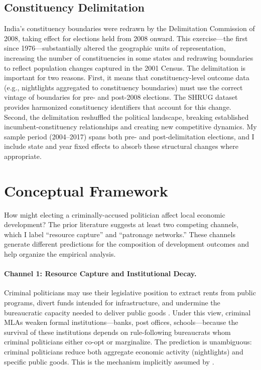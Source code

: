 \documentclass[12pt]{article}
\begin{document}
\subsection{Constituency Delimitation}

India's constituency boundaries were redrawn by the Delimitation Commission of 2008, taking effect for elections held from 2008 onward. This exercise---the first since 1976---substantially altered the geographic units of representation, increasing the number of constituencies in some states and redrawing boundaries to reflect population changes captured in the 2001 Census. The delimitation is important for two reasons. First, it means that constituency-level outcome data (e.g., nightlights aggregated to constituency boundaries) must use the correct vintage of boundaries for pre- and post-2008 elections. The SHRUG dataset provides harmonized constituency identifiers that account for this change. Second, the delimitation reshuffled the political landscape, breaking established incumbent-constituency relationships and creating new competitive dynamics. My sample period (2004--2017) spans both pre- and post-delimitation elections, and I include state and year fixed effects to absorb these structural changes where appropriate.


\section{Conceptual Framework}

How might electing a criminally-accused politician affect local economic development? The prior literature suggests at least two competing channels, which I label ``resource capture'' and ``patronage networks.'' These channels generate different predictions for the composition of development outcomes and help organize the empirical analysis.

\paragraph{Channel 1: Resource Capture and Institutional Decay.} Criminal politicians may use their legislative position to extract rents from public programs, divert funds intended for infrastructure, and undermine the bureaucratic capacity needed to deliver public goods \citep{aidt2011}. Under this view, criminal MLAs weaken formal institutions---banks, post offices, schools---because the survival of these institutions depends on rule-following bureaucrats whom criminal politicians either co-opt or marginalize. The prediction is unambiguous: criminal politicians reduce both aggregate economic activity (nightlights) and specific public goods. This is the mechanism implicitly assumed by \citet{prakash2019}.
\end{document}

